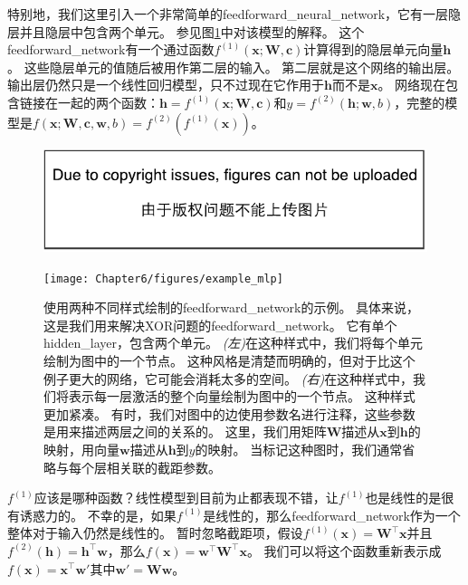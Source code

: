 特别地，我们这里引入一个非常简单的\gls{feedforward_neural_network}，它有一层隐层并且隐层中包含两个单元。
参见图\ref{fig:chap6_example_mlp}中对该模型的解释。
这个\gls{feedforward_network}有一个通过函数$f^{(1)}(\bm{x};\bm{W}, \bm{c})$计算得到的隐层单元向量$\bm{h}$。
这些隐层单元的值随后被用作第二层的输入。
第二层就是这个网络的输出层。
输出层仍然只是一个线性回归模型，只不过现在它作用于$\bm{h}$而不是$\bm{x}$。
网络现在包含链接在一起的两个函数：$\bm{h}=f^{(1)}(\bm{x}; \bm{W}, \bm{c})$和$y = f^{(2)}(\bm{h}; \bm{w}, b)$，完整的模型是$f(\bm{x}; \bm{W}, \bm{c}, \bm{w}, b) = f^{(2)}(f^{(1)}(\bm{x}))$。
\begin{figure}[!htb]
\ifOpenSource
\centerline{\includegraphics{figure.pdf}}
\else
\centerline{\texttt{[image: Chapter6/figures/example\_mlp]}}
\fi
\captionsetup{singlelinecheck=off}
\caption{使用两种不同样式绘制的\gls{feedforward_network}的示例。
具体来说，这是我们用来解决XOR问题的\gls{feedforward_network}。
它有单个\gls{hidden_layer}，包含两个单元。
\emph{(左)}在这种样式中，我们将每个单元绘制为图中的一个节点。
这种风格是清楚而明确的，但对于比这个例子更大的网络，它可能会消耗太多的空间。
\emph{(右)}在这种样式中，我们将表示每一层激活的整个向量绘制为图中的一个节点。
这种样式更加紧凑。
有时，我们对图中的边使用参数名进行注释，这些参数是用来描述两层之间的关系的。
这里，我们用矩阵$\bm{W}$描述从$\bm{x}$到$\bm{h}$的映射，用向量$\bm{w}$描述从$\bm{h}$到$y$的映射。
当标记这种图时，我们通常省略与每个层相关联的截距参数。}
\label{fig:chap6_example_mlp}
\end{figure}


$f^{(1)}$应该是哪种函数？线性模型到目前为止都表现不错，让$f^{(1)}$也是线性的是很有诱惑力的。
不幸的是，如果$f^{(1)}$是线性的，那么\gls{feedforward_network}作为一个整体对于输入仍然是线性的。
暂时忽略截距项，假设$f^{(1)}(\bm{x})= \bm{W}^\top \bm{x}$并且$f^{(2)}(\bm{h})=\bm{h}^\top \bm{w}$，那么$f(\bm{x}) = \bm{w}^\top\bm{W}^\top \bm{x}$。
我们可以将这个函数重新表示成$f(\bm{x}) = \bm{x}^\top\bm{w}'$其中$\bm{w}' = \bm{W}\bm{w}$。



